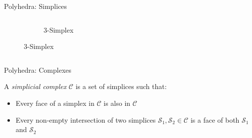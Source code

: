 \begin{frame}[fragile]{Polyhedra: Simplices}
\begin{columns}
\begin{column}{0.7\textwidth}
\begin{figure}
\begin{subfigure}{0.3\columnwidth}
                    \caption{$3$-Simplex}
                \end{subfigure}
            \end{figure}
        \end{column}
    \end{columns}
\end{frame}


\begin{frame}[fragile]{Polyhedra: Complexes}
    \begin{definition}
        A \emph{simplicial complex} $\mathcal{C}$ is a set of simplices such that:
        \begin{itemize}
        \item Every face of a simplex in $\mathcal{C}$ is also in $\mathcal{C}$
        \item Every non-empty intersection of two simplices $\mathcal{S}_1,\mathcal{S}_2\in\mathcal{C}$ is a face of both $\mathcal{S}_1$ and $\mathcal{S}_2$
        \end{itemize}
        \end{definition}
\end{frame}

